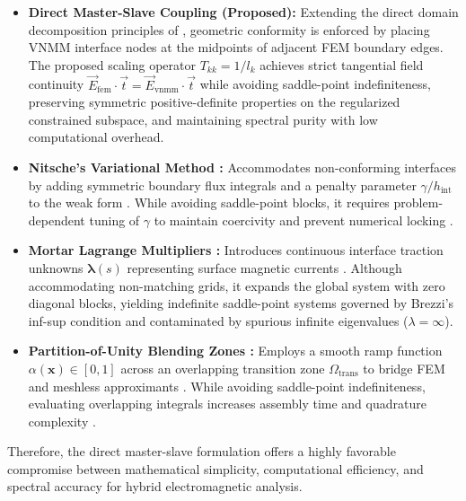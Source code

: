 \documentclass[preprint,12pt]{elsarticle}
\begin{document}
\begin{itemize}
    \item \textbf{Direct Master-Slave Coupling (Proposed):} Extending the direct domain decomposition principles of \cite{tsukerman1992overlapping, elkadmiri2022hybrid}, geometric conformity is enforced by placing VNMM interface nodes at the midpoints of adjacent FEM boundary edges. The proposed scaling operator $T_{kk} = 1/l_k$ achieves strict tangential field continuity $\vec{E}_{\mathrm{fem}} \cdot \vec{t} = \vec{E}_{\mathrm{vnmm}} \cdot \vec{t}$ while avoiding saddle-point indefiniteness, preserving symmetric positive-definite properties on the regularized constrained subspace, and maintaining spectral purity with low computational overhead.
    \item \textbf{Nitsche's Variational Method \cite{nitsche1971uber, fernandez2004imposing}:} Accommodates non-conforming interfaces by adding symmetric boundary flux integrals and a penalty parameter $\gamma / h_{\mathrm{int}}$ to the weak form \cite{hansbo2002unfitted}. While avoiding saddle-point blocks, it requires problem-dependent tuning of $\gamma$ to maintain coercivity and prevent numerical locking \cite{fernandez2004imposing}.
    \item \textbf{Mortar Lagrange Multipliers \cite{bernardi1994mortar, benbelgacem1999mortar}:} Introduces continuous interface traction unknowns $\boldsymbol{\lambda}(s)$ representing surface magnetic currents \cite{buffa2001mortar}. Although accommodating non-matching grids, it expands the global system with zero diagonal blocks, yielding indefinite saddle-point systems governed by Brezzi's inf-sup condition \cite{brezzi1974existence} and contaminated by spurious infinite eigenvalues ($\lambda = \infty$).
    \item \textbf{Partition-of-Unity Blending Zones \cite{melenk1996partition, babuska1997partition}:} Employs a smooth ramp function $\alpha(\mathbf{x}) \in [0, 1]$ across an overlapping transition zone $\Omega_{\mathrm{trans}}$ to bridge FEM and meshless approximants \cite{belytschko1995coupled, krongauz1996enforcement}. While avoiding saddle-point indefiniteness, evaluating overlapping integrals increases assembly time and quadrature complexity \cite{krongauz1996enforcement}.
\end{itemize}

Therefore, the direct master-slave formulation offers a highly favorable compromise between mathematical simplicity, computational efficiency, and spectral accuracy for hybrid electromagnetic analysis.
\end{document}
